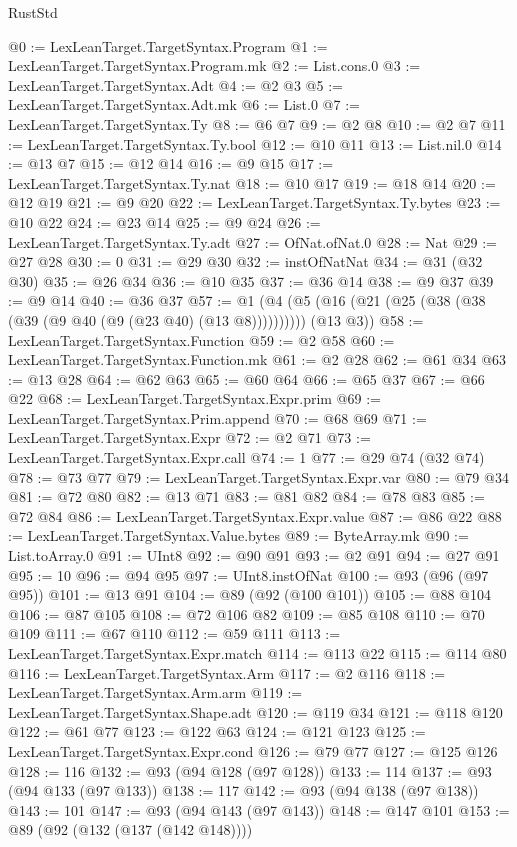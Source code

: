 \begin{lexlean}{RustStd}
\begin{coremodule}
{\begin{coremodule}
{{{{{{{{{{{{{{{{{{{{{{{{{{{{{{{{{{{{{{{{{{{{{{{{{{{{{{{@0 := LexLeanTarget.TargetSyntax.Program
@1 := LexLeanTarget.TargetSyntax.Program.mk
@2 := List.cons.{0}
@3 := LexLeanTarget.TargetSyntax.Adt
@4 := @2 @3
@5 := LexLeanTarget.TargetSyntax.Adt.mk
@6 := List.{0}
@7 := LexLeanTarget.TargetSyntax.Ty
@8 := @6 @7
@9 := @2 @8
@10 := @2 @7
@11 := LexLeanTarget.TargetSyntax.Ty.bool
@12 := @10 @11
@13 := List.nil.{0}
@14 := @13 @7
@15 := @12 @14
@16 := @9 @15
@17 := LexLeanTarget.TargetSyntax.Ty.nat
@18 := @10 @17
@19 := @18 @14
@20 := @12 @19
@21 := @9 @20
@22 := LexLeanTarget.TargetSyntax.Ty.bytes
@23 := @10 @22
@24 := @23 @14
@25 := @9 @24
@26 := LexLeanTarget.TargetSyntax.Ty.adt
@27 := OfNat.ofNat.{0}
@28 := Nat
@29 := @27 @28
@30 := 0
@31 := @29 @30
@32 := instOfNatNat
@34 := @31 (@32 @30)
@35 := @26 @34
@36 := @10 @35
@37 := @36 @14
@38 := @9 @37
@39 := @9 @14
@40 := @36 @37
@57 := @1 (@4 (@5 (@16 (@21 (@25 (@38 (@38 (@39 (@9 @40 (@9 (@23 @40) (@13 @8)))))))))) (@13 @3))
@58 := LexLeanTarget.TargetSyntax.Function
@59 := @2 @58
@60 := LexLeanTarget.TargetSyntax.Function.mk
@61 := @2 @28
@62 := @61 @34
@63 := @13 @28
@64 := @62 @63
@65 := @60 @64
@66 := @65 @37
@67 := @66 @22
@68 := LexLeanTarget.TargetSyntax.Expr.prim
@69 := LexLeanTarget.TargetSyntax.Prim.append
@70 := @68 @69
@71 := LexLeanTarget.TargetSyntax.Expr
@72 := @2 @71
@73 := LexLeanTarget.TargetSyntax.Expr.call
@74 := 1
@77 := @29 @74 (@32 @74)
@78 := @73 @77
@79 := LexLeanTarget.TargetSyntax.Expr.var
@80 := @79 @34
@81 := @72 @80
@82 := @13 @71
@83 := @81 @82
@84 := @78 @83
@85 := @72 @84
@86 := LexLeanTarget.TargetSyntax.Expr.value
@87 := @86 @22
@88 := LexLeanTarget.TargetSyntax.Value.bytes
@89 := ByteArray.mk
@90 := List.toArray.{0}
@91 := UInt8
@92 := @90 @91
@93 := @2 @91
@94 := @27 @91
@95 := 10
@96 := @94 @95
@97 := UInt8.instOfNat
@100 := @93 (@96 (@97 @95))
@101 := @13 @91
@104 := @89 (@92 (@100 @101))
@105 := @88 @104
@106 := @87 @105
@108 := @72 @106 @82
@109 := @85 @108
@110 := @70 @109
@111 := @67 @110
@112 := @59 @111
@113 := LexLeanTarget.TargetSyntax.Expr.match
@114 := @113 @22
@115 := @114 @80
@116 := LexLeanTarget.TargetSyntax.Arm
@117 := @2 @116
@118 := LexLeanTarget.TargetSyntax.Arm.arm
@119 := LexLeanTarget.TargetSyntax.Shape.adt
@120 := @119 @34
@121 := @118 @120
@122 := @61 @77
@123 := @122 @63
@124 := @121 @123
@125 := LexLeanTarget.TargetSyntax.Expr.cond
@126 := @79 @77
@127 := @125 @126
@128 := 116
@132 := @93 (@94 @128 (@97 @128))
@133 := 114
@137 := @93 (@94 @133 (@97 @133))
@138 := 117
@142 := @93 (@94 @138 (@97 @138))
@143 := 101
@147 := @93 (@94 @143 (@97 @143))
@148 := @147 @101
@153 := @89 (@92 (@132 (@137 (@142 @148))))
}}}}}}}}}}}}}}}}}}}}}}}}}}}}}}}}}}}}}}}}}}}}}}}}}}}}}}}
\end{coremodule}}
\end{coremodule}
\end{lexlean}
